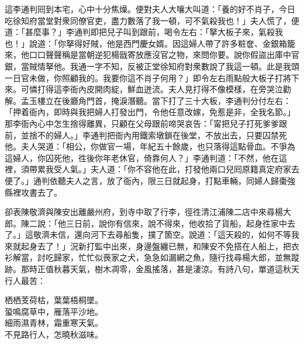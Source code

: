 這李通判囘到本宅，心中十分焦燥。便對夫人大嚷大叫道：「養的好不肖子，今日吃徐知府當堂對衆同僚官吏，盡力數落了我一頓，可不氣殺我也！」夫人慌了，便道：「甚麼事？」李通判即把兒子叫到跟前，喝令左右：「拏大板子來，氣殺我也！」說道：「你拏得好賊，他是西門慶女婿。因這婦人帶了許多粧奩、金銀箱籠來，他口口聲聲稱是當朝逆犯楊戩寄放應沒官之物，來問你要。說你假盜出庫中官銀，當賊情拏他。我通一字不知，反被正堂徐知府對衆數說了我這一頓。此是我頭一日官未做，你照顧我的。我要你這不肖子何用？」即令左右雨點般大板子打將下來。可憐打得這李衙內皮開肉綻，鮮血迸流。夫人見打得不像模樣，在旁哭泣勸解。孟玉樓立在後廳角門首，掩淚潛聽。當下打了三十大板，李通判分付左右：「押着衙內，即時與我把婦人打發出門，令他任意改嫁，免惹是非，全我名節。」那李衙內心中怎生捨得離異，只顧在父母跟前啼哭哀告：「甯把兒子打死爹爹跟前，並捨不的婦人。」李通判把衙內用鐵索墩鎖在後堂，不放出去，只要囚禁死他。夫人哭道：「相公，你做官一場，年紀五十餘歲，也只落得這點骨血。不爭為這婦人，你囚死他，徃後你年老休官，倚靠何人？」{}{}李通判道：「不然，他在這裡，須帶累我受人氣。」夫人道：「你不容他在此，打發他兩口兒囘原籍真定府家去便了。」{}通判依聽夫人之言，放了衙內，限三日就起身，打點車輛，同婦人歸棗強縣裡攻書去了。

卻表陳敬濟與陳安出離嚴州府，到寺中取了行李，徑徃清江浦陳二店中來尋楊大郎。陳二說：「他三日前，說你有信來，說不得來，他收拾了貨船，起身徃家中去了。」{}這敬濟未信，還向河下去尋船隻，撲了箇空。說道：「這天殺的，如何不等我來就起身去了！」{}況新打監中出來，身邊盤纏已無，和陳安不免搭在人船上，把衣衫解當，討吃歸家，忙忙似䘮家之犬，急急如漏網之魚，隨行找尋楊大郎，並無蹤跡。那時正值秋暮天氣，樹木凋零，金風搖落，甚是淒涼。有詩八句，單道這秋天行人最苦：

\begin{myquote}
栖栖芰荷枯，葉葉梧桐墜。\\蛩鳴腐草中，雁落平沙地。\\細雨濕青林，霜重寒天氣。\\不見路行人，怎曉秋滋味。
\end{myquote}

